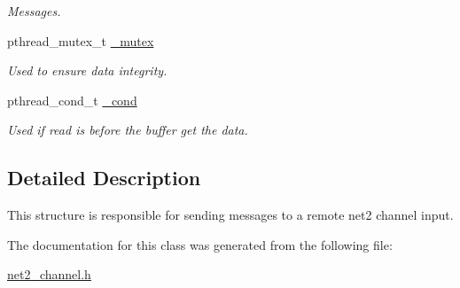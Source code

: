 \begin{DoxyCompactItemize}
\begin{DoxyCompactList}\small\item\em Messages. \end{DoxyCompactList}\item 
\hypertarget{structnet2__channel__output__t_a440374b4242121a1dafbe2f457264b15}{pthread\-\_\-mutex\-\_\-t \hyperlink{structnet2__channel__output__t_a440374b4242121a1dafbe2f457264b15}{\-\_\-mutex}}\label{structnet2__channel__output__t_a440374b4242121a1dafbe2f457264b15}

\begin{DoxyCompactList}\small\item\em Used to ensure data integrity. \end{DoxyCompactList}\item 
\hypertarget{structnet2__channel__output__t_ab87a0f05e9a6580b15fb5e9fc21e2142}{pthread\-\_\-cond\-\_\-t \hyperlink{structnet2__channel__output__t_ab87a0f05e9a6580b15fb5e9fc21e2142}{\-\_\-cond}}\label{structnet2__channel__output__t_ab87a0f05e9a6580b15fb5e9fc21e2142}

\begin{DoxyCompactList}\small\item\em Used if read is before the buffer get the data. \end{DoxyCompactList}\end{DoxyCompactItemize}


\subsection{Detailed Description}
This structure is responsible for sending messages to a remote net2 channel input. 

The documentation for this class was generated from the following file\-:\begin{DoxyCompactItemize}
\item 
\hyperlink{net2__channel_8h}{net2\-\_\-channel.\-h}\end{DoxyCompactItemize}
